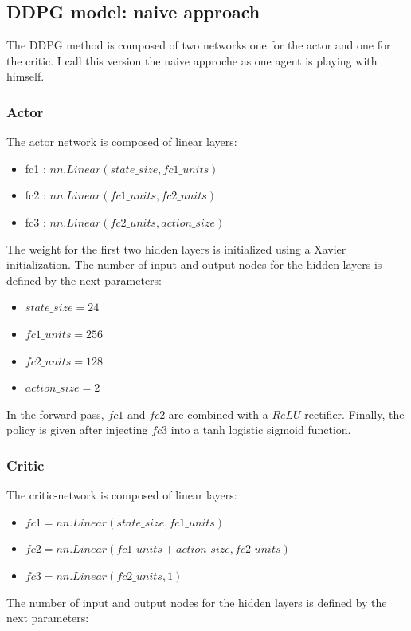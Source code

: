 \documentclass[12pt]{article}
\begin{document}
\subsection{DDPG model: naive approach} 
The DDPG method is composed of two networks one for the actor and one for the critic. I call this version the naive approche as one agent is playing with himself.

\subsubsection{Actor}
The actor network is composed of linear layers:
\begin{itemize}
\item fc1 : $nn.Linear(state\_size, fc1\_units)$
\item fc2 : $nn.Linear(fc1\_units, fc2\_units)$
\item fc3 : $nn.Linear(fc2\_units, action\_size)$
\end{itemize}

The weight for the first two hidden layers is initialized using a Xavier initialization.
The number of input and output nodes for the hidden layers is defined by the next parameters:

\begin{itemize}
\item $state\_size=24$
\item $fc1\_units=256$
\item $fc2\_units=128$
\item $action\_size=2$
\end{itemize}

In the forward pass, $fc1$ and $fc2$ are combined with a $ReLU$ rectifier. Finally, the policy is given after injecting $fc3$ into a tanh logistic sigmoid function.

\subsubsection{Critic}
The critic-network is composed of linear layers:

\begin{itemize}
\item $fc1 = nn.Linear(state\_size, fc1\_units)$
\item $fc2 = nn.Linear(fc1\_units+action\_size, fc2\_units)$
\item $fc3 = nn.Linear(fc2\_units, 1)$
\end{itemize}
The number of input and output nodes for the hidden layers is defined by the next parameters:
\end{document}
